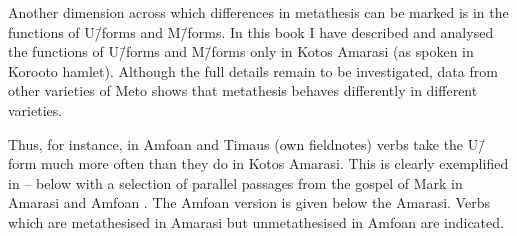 Another dimension across which differences in metathesis
can be marked is in the functions of U\=/forms and M\=/forms.
In this book I have described and analysed the functions of U\=/forms and M\=/forms
only in Kotos Amarasi (as spoken in Koro{\Q}oto hamlet).
Although the full details remain to be investigated,
data from other varieties of Meto shows that metathesis
behaves differently in different varieties.

Thus, for instance, in Amfo{\Q}an \citep{cu18}
and Timaus (own fieldnotes) verbs take the U\=/form
much more often than they do in Kotos Amarasi.
This is clearly exemplified in --
below with a selection of parallel passages from the gospel
of Mark in Amarasi and Amfo{\Q}an \citep{UBB18}.
The Amfo{\Q}an version is given below the Amarasi.
Verbs which are metathesised in Amarasi but
unmetathesised in Amfo{\Q}an are indicated.

\begin{exe}\let\eachwordtwo=\itshape
	\label{ex:Mark 1:2}
	\label{ex:Mark 3:24}
	\label{ex:Mark 11:19}
	\label{ex:Mark 16:7}
\end{exe}

